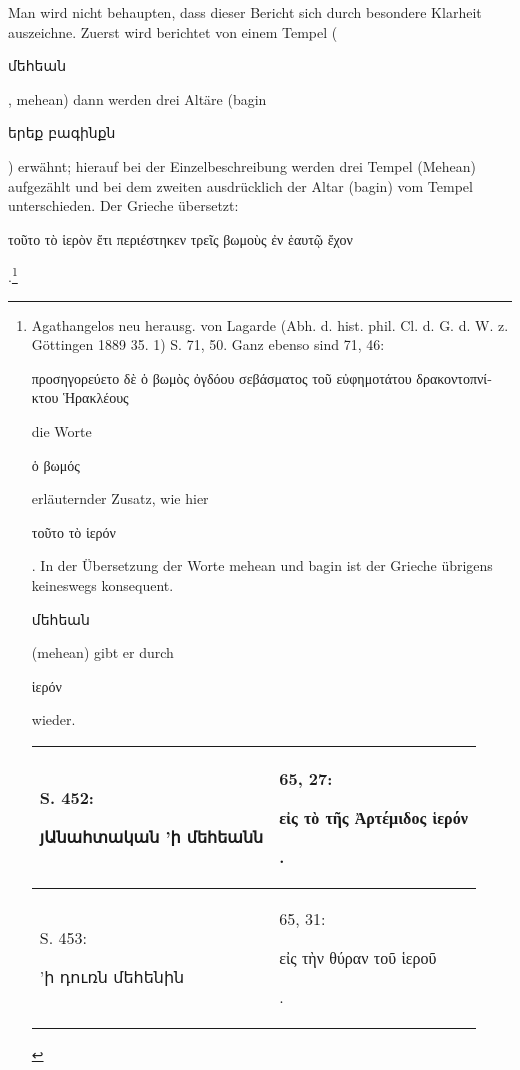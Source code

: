 \documentclass{article}
\begin{document}
Man wird nicht behaupten, dass dieser Bericht sich durch besondere Klarheit auszeichne. Zuerst wird berichtet von einem Tempel (\begin{armenian}մեհեան\end{armenian}, mehean) dann werden drei Altäre (bagin \begin{armenian}երեք բագինքն\end{armenian}) erwähnt; hierauf bei der Einzelbeschreibung werden drei Tempel (Mehean) aufgezählt und bei dem zweiten ausdrücklich der Altar (bagin) vom Tempel unterschieden. Der Grieche übersetzt: \begin{greek}τοῦτο τὸ ἱερὸν ἔτι περιέστηκεν τρεῖς βωμοὺς ἐν ἑαυτῷ ἔχον\end{greek}.\footnote{Agathangelos neu herausg. von Lagarde (Abh. d. hist. phil. Cl. d. G. d. W. z. Göttingen 1889 35. 1) S. 71, 50. Ganz ebenso sind 71, 46: \begin{greek}προσηγορεύετο δὲ ὁ βωμὸς ὀγδόου σεβάσματος τοῦ εὐφημοτάτου δρακοντοπνίκτου Ἡρακλέους\end{greek} die Worte \begin{greek}ὁ βωμός\end{greek} erläuternder Zusatz, wie hier \begin{greek}τοῦτο τὸ ἱερόν\end{greek}. In der Übersetzung der Worte mehean und bagin ist der Grieche übrigens keineswegs konsequent. \begin{armenian}մեհեան\end{armenian} (mehean) gibt er durch \begin{greek}ἱερόν\end{greek} wieder.\hspace*{5mm}\begin{table}[H]
    \centering
    \footnotesize
    \begin{tabular}{p{45mm}|p{45mm}}
    \hline
        S. 452: \begin{armenian}յԱնահտական  'ի մեհեանն\end{armenian} & 65, 27: \begin{greek}εἰς τὸ τῆς Ἀρτέμιδος ἱερόν\end{greek}.   \\ \hline
        S. 453: \begin{armenian}'ի դուռն մեհենին\end{armenian} & 65, 31: \begin{greek}εἰς τὴν θύραν τοῦ ἱεροῦ\end{greek}.   \\ \hline

\end{tabular}
\end{table}}
\end{document}
